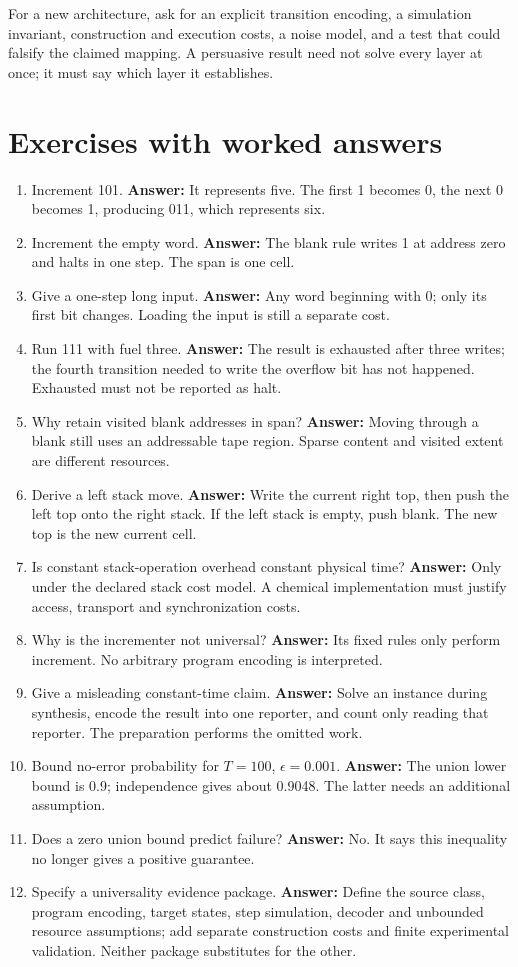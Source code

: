 For a new architecture, ask for an explicit transition encoding, a simulation
invariant, construction and execution costs, a noise model, and a test that
could falsify the claimed mapping. A persuasive result need not solve every
layer at once; it must say which layer it establishes.

\section{Exercises with worked answers}
\begin{enumerate}
\item Increment 101. \textbf{Answer:} It represents five. The first 1
becomes 0, the next 0 becomes 1, producing 011, which represents six.
\item Increment the empty word. \textbf{Answer:} The blank rule writes 1
at address zero and halts in one step. The span is one cell.
\item Give a one-step long input. \textbf{Answer:} Any word beginning with
0; only its first bit changes. Loading the input is still a separate cost.
\item Run 111 with fuel three. \textbf{Answer:} The result is exhausted
after three writes; the fourth transition needed to write the overflow bit
has not happened. Exhausted must not be reported as halt.
\item Why retain visited blank addresses in span? \textbf{Answer:} Moving
through a blank still uses an addressable tape region. Sparse content and
visited extent are different resources.
\item Derive a left stack move. \textbf{Answer:} Write the current right
top, then push the left top onto the right stack. If the left stack is
empty, push blank. The new top is the new current cell.
\item Is constant stack-operation overhead constant physical time?
\textbf{Answer:} Only under the declared stack cost model. A chemical
implementation must justify access, transport and synchronization costs.
\item Why is the incrementer not universal? \textbf{Answer:} Its fixed
rules only perform increment. No arbitrary program encoding is interpreted.
\item Give a misleading constant-time claim. \textbf{Answer:} Solve an
instance during synthesis, encode the result into one reporter, and count
only reading that reporter. The preparation performs the omitted work.
\item Bound no-error probability for $T=100$, $\epsilon=0.001$.
\textbf{Answer:} The union lower bound is 0.9; independence gives about
0.9048. The latter needs an additional assumption.
\item Does a zero union bound predict failure? \textbf{Answer:} No. It
says this inequality no longer gives a positive guarantee.
\item Specify a universality evidence package. \textbf{Answer:} Define
the source class, program encoding, target states, step simulation, decoder
and unbounded resource assumptions; add separate construction costs and
finite experimental validation. Neither package substitutes for the other.
\end{enumerate}

